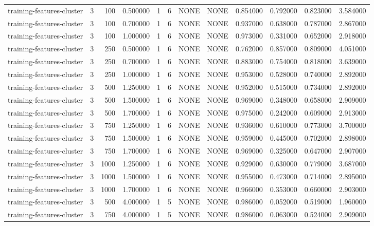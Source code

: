 \begin{tabular}{lrrrllllrrrr}
training-features-cluster & 3 & 100 & 0.500000 & 1 & 6 & NONE & NONE & 0.854000 & 0.792000 & 0.823000 & 3.584000 \\
training-features-cluster & 3 & 100 & 0.700000 & 1 & 6 & NONE & NONE & 0.937000 & 0.638000 & 0.787000 & 2.867000 \\
training-features-cluster & 3 & 100 & 1.000000 & 1 & 6 & NONE & NONE & 0.973000 & 0.331000 & 0.652000 & 2.918000 \\
training-features-cluster & 3 & 250 & 0.500000 & 1 & 6 & NONE & NONE & 0.762000 & 0.857000 & 0.809000 & 4.051000 \\
training-features-cluster & 3 & 250 & 0.700000 & 1 & 6 & NONE & NONE & 0.883000 & 0.754000 & 0.818000 & 3.639000 \\
training-features-cluster & 3 & 250 & 1.000000 & 1 & 6 & NONE & NONE & 0.953000 & 0.528000 & 0.740000 & 2.892000 \\
training-features-cluster & 3 & 500 & 1.250000 & 1 & 6 & NONE & NONE & 0.952000 & 0.515000 & 0.734000 & 2.892000 \\
training-features-cluster & 3 & 500 & 1.500000 & 1 & 6 & NONE & NONE & 0.969000 & 0.348000 & 0.658000 & 2.909000 \\
training-features-cluster & 3 & 500 & 1.700000 & 1 & 6 & NONE & NONE & 0.975000 & 0.242000 & 0.609000 & 2.913000 \\
training-features-cluster & 3 & 750 & 1.250000 & 1 & 6 & NONE & NONE & 0.936000 & 0.610000 & 0.773000 & 3.700000 \\
training-features-cluster & 3 & 750 & 1.500000 & 1 & 6 & NONE & NONE & 0.959000 & 0.445000 & 0.702000 & 2.898000 \\
training-features-cluster & 3 & 750 & 1.700000 & 1 & 6 & NONE & NONE & 0.969000 & 0.325000 & 0.647000 & 2.907000 \\
training-features-cluster & 3 & 1000 & 1.250000 & 1 & 6 & NONE & NONE & 0.929000 & 0.630000 & 0.779000 & 3.687000 \\
training-features-cluster & 3 & 1000 & 1.500000 & 1 & 6 & NONE & NONE & 0.955000 & 0.473000 & 0.714000 & 2.895000 \\
training-features-cluster & 3 & 1000 & 1.700000 & 1 & 6 & NONE & NONE & 0.966000 & 0.353000 & 0.660000 & 2.903000 \\
training-features-cluster & 3 & 500 & 4.000000 & 1 & 5 & NONE & NONE & 0.986000 & 0.052000 & 0.519000 & 1.960000 \\
training-features-cluster & 3 & 750 & 4.000000 & 1 & 5 & NONE & NONE & 0.986000 & 0.063000 & 0.524000 & 2.909000 \\

\end{tabular}
